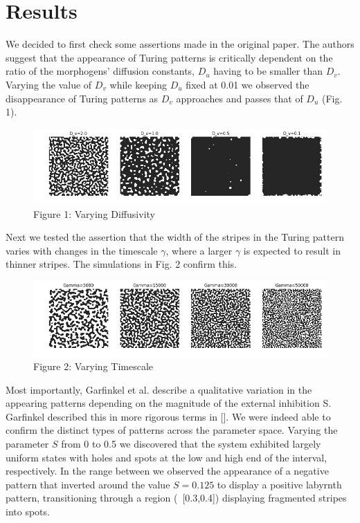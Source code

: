 \documentclass{article}
\begin{document}
\section{Results}

We decided to first check some assertions made in the original paper. The authors suggest that the appearance of Turing patterns is critically dependent on the ratio of the morphogens' diffusion constants, $D_u$ having to be smaller than $D_v$. Varying the value of $D_v$ while keeping $D_u$ fixed at 0.01 we observed the disappearance of Turing patterns as $D_v$ approaches and passes that of $D_u$ (Fig. 1).

\begin{figure}[H]
  \includegraphics[width=\linewidth]{diffusivity.png}
  \caption{Figure 1: Varying Diffusivity}
  \label{fig:dv}
\end{figure}

Next we tested the assertion that the width of the stripes in the Turing pattern varies with changes in the timescale $\gamma$, where a larger $\gamma$ is expected to result in thinner stripes. The simulations in Fig. 2 confirm this.

\begin{figure}[H]
  \includegraphics[width=\linewidth]{timescale.png}
  \caption{Figure 2: Varying Timescale}
  \label{fig:gamma}
\end{figure}

Most importantly, Garfinkel et al. describe a qualitative variation in the appearing patterns depending on the magnitude of the external inhibition S. Garfinkel described this in more rigorous terms in []. We were indeed able to confirm the distinct types of patterns across the parameter space. Varying the parameter $S$ from 0 to 0.5 we discovered that the system exhibited largely uniform states with holes and spots at the low and high end of the interval, respectively. In the range between we observed the appearance of a negative pattern that inverted around the value $S=0.125$ to display a positive labyrnth pattern, transitioning through a region (~[0.3,0.4]) displaying fragmented stripes into spots.
\end{document}
